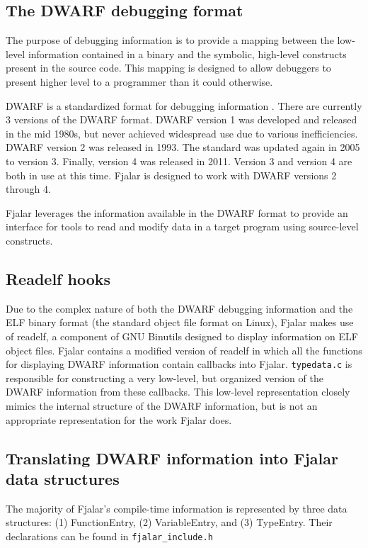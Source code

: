 \documentclass{article}
\begin{document}
\subsection{The DWARF debugging format}
The purpose of debugging information is to provide a mapping between
the low-level information contained in a binary and the symbolic,
high-level constructs present in the source code. This mapping is
designed to allow debuggers to present higher level to a programmer
than it could otherwise.

DWARF is a standardized format for debugging information
\cite{silverstein1993dwarf}. There are currently 3 versions of the
DWARF format. DWARF version 1 was developed and released in the mid
1980s, but never achieved widespread use due to various inefficiencies.
DWARF version 2 was released in 1993.  The standard was updated again
in 2005 to version 3.  Finally, version 4 was released in 2011.
Version 3 and version 4 are both in use at this time.  Fjalar is
designed to work with DWARF versions 2 through 4.

Fjalar leverages the information available in the DWARF format to
provide an interface for tools to read and modify data in a target
program using source-level constructs.


\subsection{Readelf hooks}
Due to the complex nature of both the DWARF debugging information and
the ELF binary format (the standard object file format on Linux),
Fjalar makes use of readelf, a component of GNU Binutils designed to
display information on ELF object files. Fjalar contains a modified
version of readelf in which all the functions for displaying DWARF
information contain callbacks into Fjalar. \texttt{typedata.c} is
responsible for constructing a very low-level, but organized version
of the DWARF information from these callbacks. This low-level 
representation closely mimics the internal structure of the DWARF
information, but is not an appropriate representation for the work
Fjalar does.

\subsection{Translating DWARF information into Fjalar data structures}
The majority of Fjalar's compile-time information is represented by
three data structures: (1) FunctionEntry, (2) VariableEntry, and (3)
TypeEntry. Their declarations can be found in \texttt{fjalar\_include.h}
\end{document}
